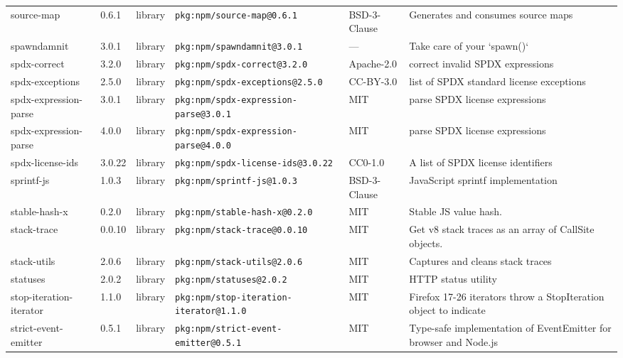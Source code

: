 \documentclass[11pt,a4paper]{article}
\begin{document}
\begin{longtable}{|p{4cm}|p{2cm}|p{1.6cm}|p{5cm}|p{1.5cm}|p{3.5cm}|}
\raggedright source-map & 0.6.1 & library & \small\texttt{pkg:npm/source-map@0.6.1} & BSD-3-Clause & \small Generates and consumes source maps \\
\raggedright spawndamnit & 3.0.1 & library & \small\texttt{pkg:npm/spawndamnit@3.0.1} & — & \small Take care of your `spawn()` \\
\raggedright spdx-correct & 3.2.0 & library & \small\texttt{pkg:npm/spdx-correct@3.2.0} & Apache-2.0 & \small correct invalid SPDX expressions \\
\raggedright spdx-exceptions & 2.5.0 & library & \small\texttt{pkg:npm/spdx-exceptions@2.5.0} & CC-BY-3.0 & \small list of SPDX standard license exceptions \\
\raggedright spdx-expression-parse & 3.0.1 & library & \small\texttt{pkg:npm/spdx-expression-parse@3.0.1} & MIT & \small parse SPDX license expressions \\
\raggedright spdx-expression-parse & 4.0.0 & library & \small\texttt{pkg:npm/spdx-expression-parse@4.0.0} & MIT & \small parse SPDX license expressions \\
\raggedright spdx-license-ids & 3.0.22 & library & \small\texttt{pkg:npm/spdx-license-ids@3.0.22} & CC0-1.0 & \small A list of SPDX license identifiers \\
\raggedright sprintf-js & 1.0.3 & library & \small\texttt{pkg:npm/sprintf-js@1.0.3} & BSD-3-Clause & \small JavaScript sprintf implementation \\
\raggedright stable-hash-x & 0.2.0 & library & \small\texttt{pkg:npm/stable-hash-x@0.2.0} & MIT & \small Stable JS value hash. \\
\raggedright stack-trace & 0.0.10 & library & \small\texttt{pkg:npm/stack-trace@0.0.10} & MIT & \small Get v8 stack traces as an array of CallSite objects. \\
\raggedright stack-utils & 2.0.6 & library & \small\texttt{pkg:npm/stack-utils@2.0.6} & MIT & \small Captures and cleans stack traces \\
\raggedright statuses & 2.0.2 & library & \small\texttt{pkg:npm/statuses@2.0.2} & MIT & \small HTTP status utility \\
\raggedright stop-iteration-iterator & 1.1.0 & library & \small\texttt{pkg:npm/stop-iteration-iterator@1.1.0} & MIT & \small Firefox 17-26 iterators throw a StopIteration object to indicate  \\
\raggedright strict-event-emitter & 0.5.1 & library & \small\texttt{pkg:npm/strict-event-emitter@0.5.1} & MIT & \small Type-safe implementation of EventEmitter for browser and Node.js \\

\end{longtable}
\end{document}

